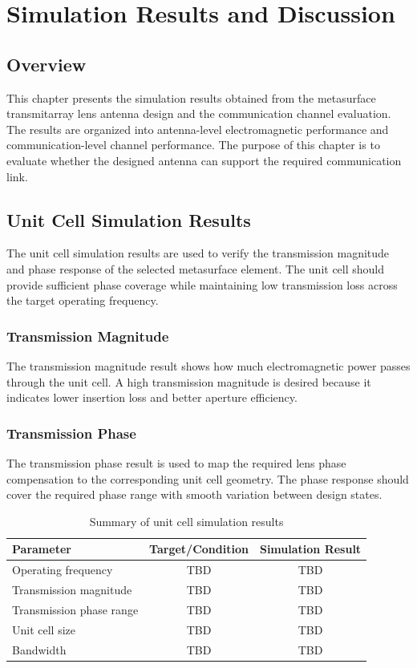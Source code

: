 \chapter{Simulation Results and Discussion}

\section{Overview}
This chapter presents the simulation results obtained from the metasurface transmitarray lens antenna design and the communication channel evaluation. The results are organized into antenna-level electromagnetic performance and communication-level channel performance. The purpose of this chapter is to evaluate whether the designed antenna can support the required communication link.

\section{Unit Cell Simulation Results}
The unit cell simulation results are used to verify the transmission magnitude and phase response of the selected metasurface element. The unit cell should provide sufficient phase coverage while maintaining low transmission loss across the target operating frequency.

\subsection{Transmission Magnitude}
The transmission magnitude result shows how much electromagnetic power passes through the unit cell. A high transmission magnitude is desired because it indicates lower insertion loss and better aperture efficiency.

\subsection{Transmission Phase}
The transmission phase result is used to map the required lens phase compensation to the corresponding unit cell geometry. The phase response should cover the required phase range with smooth variation between design states.

\begin{table}[h!]
	\begin{center}
		\caption{Summary of unit cell simulation results}
		\label{table:unit_cell_results}
		\begin{tabular}{|l|c|c|}
			\hline
			\textbf{Parameter} & \textbf{Target/Condition} & \textbf{Simulation Result} \\
			\hline
			Operating frequency & TBD & TBD \\
			Transmission magnitude & TBD & TBD \\
			Transmission phase range & TBD & TBD \\
			Unit cell size & TBD & TBD \\
			Bandwidth & TBD & TBD \\
			\hline
		\end{tabular}
	\end{center}
\end{table}

